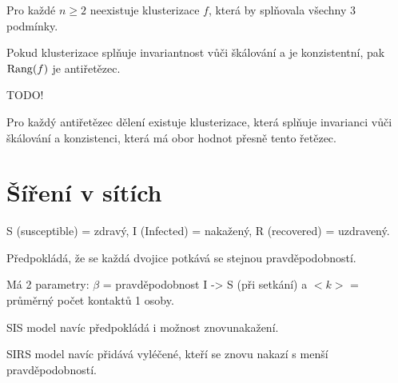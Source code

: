 \documentclass[12pt]{article}					%
\begin{document}
    \begin{veta}[Kleinberg 2002]
        Pro každé $n ≥ 2$ neexistuje klusterizace $f$, která by splňovala všechny 3 podmínky.
    \end{veta}

    \begin{veta}[Kleinberg 2002]
        Pokud klusterizace splňuje invariantnost vůči škálování a je konzistentní, pak $\operatorname{Rang}(f)$ je antiřetězec.


        \begin{dukazin}
            TODO!
        \end{dukazin}
    \end{veta}

    \begin{veta}[Kleinberg 2002]
        Pro každý antiřetězec dělení existuje klusterizace, která splňuje invarianci vůči škálování a konzistenci, která má obor hodnot přesně tento řetězec.
    \end{veta}

\section{Šíření v sítích}
    \begin{definice}
        S (susceptible) = zdravý, I (Infected) = nakažený, R (recovered) = uzdravený.
    \end{definice}

    \begin{definice}
        Předpokládá, že se každá dvojice potkává se stejnou pravděpodobností.

        Má 2 parametry: $\beta$ = pravděpodobnost I -> S (při setkání) a $<k>$ = průměrný počet kontaktů 1 osoby.
    \end{definice}

    \begin{definice}
        SIS model navíc předpokládá i možnost znovunakažení.
    \end{definice}

    \begin{definice}
        SIRS model navíc přidává vyléčené, kteří se znovu nakazí s menší pravděpodobností.
    \end{definice}

\end{document}
